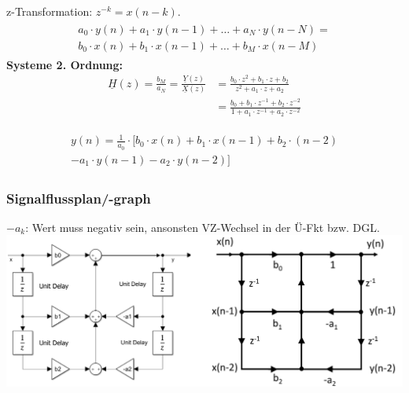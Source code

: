 \begin{multicols*}{2}
z-Transformation: $z^{-k} = x(n-k)$.
\begin{align*}
	\begin{split}
		a_{0} \cdot y(n)+a_{1} \cdot y(n-1)+\ldots+a_{N} \cdot y(n-N)=\\
		b_{0} \cdot x(n)+b_{1}  \cdot x(n-1)+\ldots+b_{M} \cdot x(n-M)
	\end{split}
\end{align*}
\textbf{Systeme 2. Ordnung:}
\begin{align*}
			\underline{H}(z)  =  \frac{b_M}{a_N}=\frac{\underline{Y}(z)}{\underline{X}(z)} &= \frac{b_0 \cdot z^{2} + b_1 \cdot z + b_2}{z^{2}+a_1 \cdot z + a_2}\\
			 &= \frac{b_0 + b_1 \cdot z^{-1} + b_2 \cdot z^{-2}}{1 + a_1 \cdot z^{-1} + a_2 \cdot  z^{-2}}
\end{align*}



\begin{align*}
\begin{split}
y(n) = \frac{1}{a_0} \cdot [ b_0 \cdot x(n) + b_1 \cdot x(n-1) + b_2 \cdot (n-2) \\ - a_1 \cdot y(n-1) - a_2 \cdot y(n-2)]
\end{split}
\end{align*}



\subsubsection{Signalflussplan/-graph}
$-a_k$: Wert muss negativ sein, ansonsten VZ-Wechsel in der Ü-Fkt bzw. DGL.\\
\includegraphics[width=\columnwidth]{Bilder/Signalfluss_plan-graph}
\clearpage

\end{multicols*}
